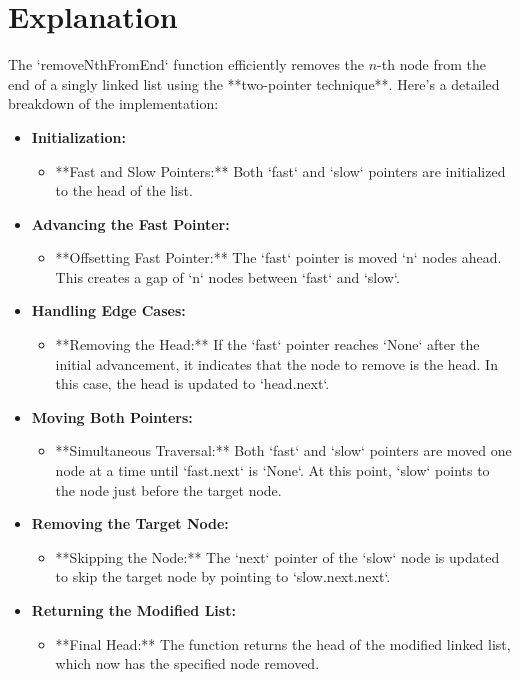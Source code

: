 \section*{Explanation}
The `removeNthFromEnd` function efficiently removes the \(n\)-th node from the end of a singly linked list using the **two-pointer technique**. Here's a detailed breakdown of the implementation:

\begin{itemize}
    \item \textbf{Initialization:}
    \begin{itemize}
        \item **Fast and Slow Pointers:** Both `fast` and `slow` pointers are initialized to the head of the list.
    \end{itemize}
    
    \item \textbf{Advancing the Fast Pointer:}
    \begin{itemize}
        \item **Offsetting Fast Pointer:** The `fast` pointer is moved `n` nodes ahead. This creates a gap of `n` nodes between `fast` and `slow`.
    \end{itemize}
    
    \item \textbf{Handling Edge Cases:}
    \begin{itemize}
        \item **Removing the Head:** If the `fast` pointer reaches `None` after the initial advancement, it indicates that the node to remove is the head. In this case, the head is updated to `head.next`.
    \end{itemize}
    
    \item \textbf{Moving Both Pointers:}
    \begin{itemize}
        \item **Simultaneous Traversal:** Both `fast` and `slow` pointers are moved one node at a time until `fast.next` is `None`. At this point, `slow` points to the node just before the target node.
    \end{itemize}
    
    \item \textbf{Removing the Target Node:}
    \begin{itemize}
        \item **Skipping the Node:** The `next` pointer of the `slow` node is updated to skip the target node by pointing to `slow.next.next`.
    \end{itemize}
    
    \item \textbf{Returning the Modified List:}
    \begin{itemize}
        \item **Final Head:** The function returns the head of the modified linked list, which now has the specified node removed.
    \end{itemize}
\end{itemize}

